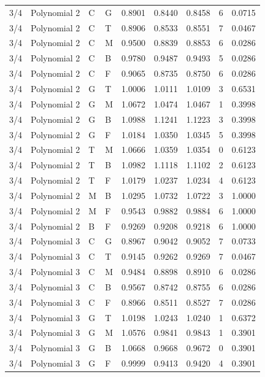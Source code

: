 \begin{longtable}{llllrrrrr}
3/4 & Polynomial 2 & C & G & 0.8901 & 0.8440 & 0.8458 & 6 & 0.0715 \\
3/4 & Polynomial 2 & C & T & 0.8906 & 0.8533 & 0.8551 & 7 & 0.0467 \\
3/4 & Polynomial 2 & C & M & 0.9500 & 0.8839 & 0.8853 & 6 & 0.0286 \\
3/4 & Polynomial 2 & C & B & 0.9780 & 0.9487 & 0.9493 & 5 & 0.0286 \\
3/4 & Polynomial 2 & C & F & 0.9065 & 0.8735 & 0.8750 & 6 & 0.0286 \\
3/4 & Polynomial 2 & G & T & 1.0006 & 1.0111 & 1.0109 & 3 & 0.6531 \\
3/4 & Polynomial 2 & G & M & 1.0672 & 1.0474 & 1.0467 & 1 & 0.3998 \\
3/4 & Polynomial 2 & G & B & 1.0988 & 1.1241 & 1.1223 & 3 & 0.3998 \\
3/4 & Polynomial 2 & G & F & 1.0184 & 1.0350 & 1.0345 & 5 & 0.3998 \\
3/4 & Polynomial 2 & T & M & 1.0666 & 1.0359 & 1.0354 & 0 & 0.6123 \\
3/4 & Polynomial 2 & T & B & 1.0982 & 1.1118 & 1.1102 & 2 & 0.6123 \\
3/4 & Polynomial 2 & T & F & 1.0179 & 1.0237 & 1.0234 & 4 & 0.6123 \\
3/4 & Polynomial 2 & M & B & 1.0295 & 1.0732 & 1.0722 & 3 & 1.0000 \\
3/4 & Polynomial 2 & M & F & 0.9543 & 0.9882 & 0.9884 & 6 & 1.0000 \\
3/4 & Polynomial 2 & B & F & 0.9269 & 0.9208 & 0.9218 & 6 & 1.0000 \\
3/4 & Polynomial 3 & C & G & 0.8967 & 0.9042 & 0.9052 & 7 & 0.0733 \\
3/4 & Polynomial 3 & C & T & 0.9145 & 0.9262 & 0.9269 & 7 & 0.0467 \\
3/4 & Polynomial 3 & C & M & 0.9484 & 0.8898 & 0.8910 & 6 & 0.0286 \\
3/4 & Polynomial 3 & C & B & 0.9567 & 0.8742 & 0.8755 & 6 & 0.0286 \\
3/4 & Polynomial 3 & C & F & 0.8966 & 0.8511 & 0.8527 & 7 & 0.0286 \\
3/4 & Polynomial 3 & G & T & 1.0198 & 1.0243 & 1.0240 & 1 & 0.6372 \\
3/4 & Polynomial 3 & G & M & 1.0576 & 0.9841 & 0.9843 & 1 & 0.3901 \\
3/4 & Polynomial 3 & G & B & 1.0668 & 0.9668 & 0.9672 & 0 & 0.3901 \\
3/4 & Polynomial 3 & G & F & 0.9999 & 0.9413 & 0.9420 & 4 & 0.3901 \\

\end{longtable}
